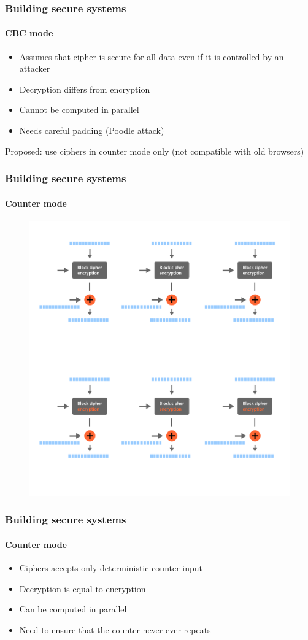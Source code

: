 \documentclass[11pt,t]{beamer}
\begin{document}
\begin{frame}
\frametitle{Building secure systems}
\framesubtitle{CBC mode}
\begin{itemize}
\item Assumes that cipher is secure for all data even if it is controlled by an attacker
\item Decryption differs from encryption
\item Cannot be computed in parallel
\item Needs careful padding (Poodle attack)
\end{itemize}
Proposed: use ciphers in counter mode only (not compatible with old browsers)
\end{frame}

\begin{frame}[fragile]
\frametitle{Building secure systems}
\framesubtitle{Counter mode}
\begin{figure}[H]
\includegraphics[height=0.85\textheight]{ctr.pdf}
\end{figure}
\end{frame}

\begin{frame}
\frametitle{Building secure systems}
\framesubtitle{Counter mode}
\begin{itemize}
\item Ciphers accepts only deterministic counter input
\item Decryption is equal to encryption
\item Can be computed in parallel
\item Need to ensure that the counter never ever repeats
\end{itemize}
\end{frame}
\end{document}
